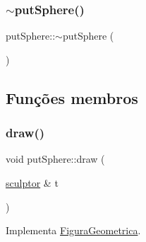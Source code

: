 \subsubsection{\texorpdfstring{$\sim$putSphere()}{~putSphere()}}
{\footnotesize\ttfamily put\+Sphere\+::$\sim$put\+Sphere (\begin{DoxyParamCaption}{ }\end{DoxyParamCaption})}


\begin{DoxyCode}{0}

\end{DoxyCode}


\subsection{Funções membros}
\mbox{\label{classput_sphere_a8a6aa041c7b3c8336ac703484f78e543}} 
\subsubsection{\texorpdfstring{draw()}{draw()}}
{\footnotesize\ttfamily void put\+Sphere\+::draw (\begin{DoxyParamCaption}\item[{\mbox{\hyperlink{classsculptor}{sculptor}} \&}]{t }\end{DoxyParamCaption})\hspace{0.3cm}{\ttfamily [virtual]}}



Implementa \mbox{\hyperlink{class_figura_geometrica_ac996dac6561c450beaf5fd643e43e095}{Figura\+Geometrica}}.


